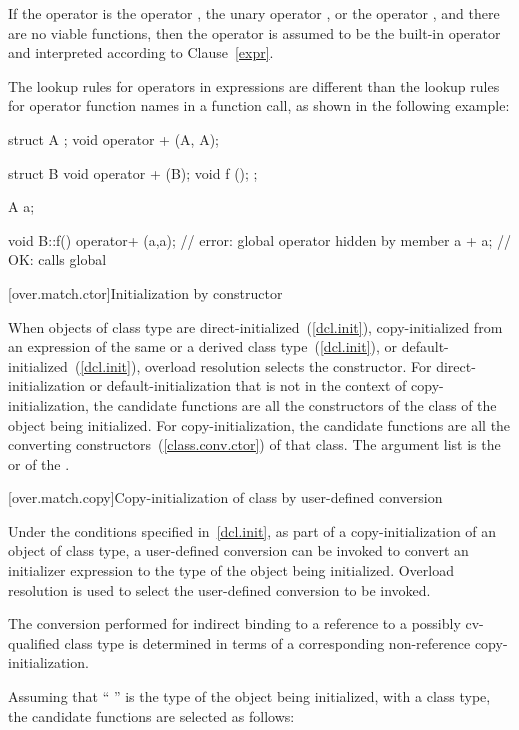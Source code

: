 \pnum
If the operator is the operator
\tcode{,},
the unary operator
\tcode{\&},
or the operator
\tcode{->},
and there are no viable functions, then the operator is
assumed to be the built-in operator and interpreted according to
Clause~\ref{expr}.

\pnum
\begin{note}
The lookup rules for operators in expressions are different than
the lookup
rules for operator function names in a function call, as shown in the following
example:

\begin{codeblock}
struct A { };
void operator + (A, A);

struct B {
  void operator + (B);
  void f ();
};

A a;

void B::f() {
  operator+ (a,a);              // error: global operator hidden by member
  a + a;                        // OK: calls global 
}
\end{codeblock}
\end{note}

[over.match.ctor]{Initialization by constructor}%

\pnum
When objects of class type are direct-initialized~(\ref{dcl.init}),
copy-initialized from an expression of the same or a
derived class type~(\ref{dcl.init}),
or default-initialized~(\ref{dcl.init}),
overload resolution selects the constructor.
For direct-initialization or default-initialization
that is not in the context of copy-initialization, the
candidate functions are
all the constructors of the class of the object being
initialized.
For copy-initialization, the candidate functions are all
the converting constructors~(\ref{class.conv.ctor}) of that
class.
The argument list is the
 or 
of the .

[over.match.copy]{Copy-initialization of class by user-defined conversion}%

\pnum
Under the conditions specified in~\ref{dcl.init}, as
part of a copy-initialization of an object of class type, a user-defined
conversion can be invoked to convert an initializer expression to the
type of the object being initialized.
Overload resolution is used
to select the user-defined conversion to be invoked.
\begin{note} The conversion performed for indirect binding to a reference to a possibly
cv-qualified class type is determined in terms of a corresponding non-reference
copy-initialization. \end{note}
Assuming that
`` '' is the type of the object being initialized, with
a class type,
the candidate functions are selected as follows:


